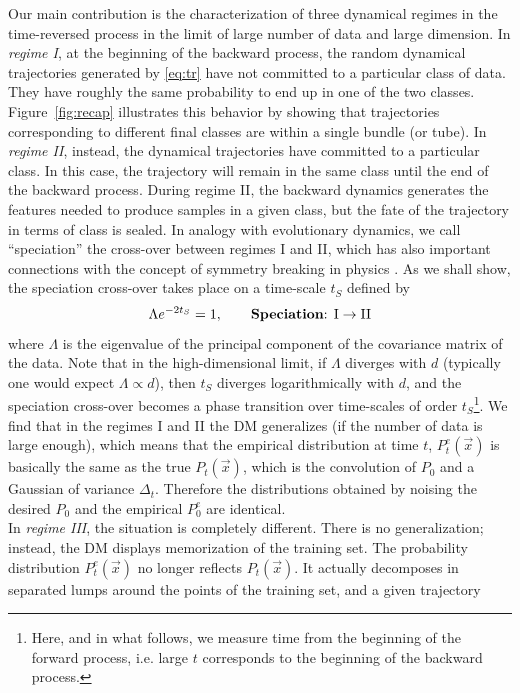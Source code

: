 \documentclass[10pt,twocolumn]{article}
\newcommand{\vx}{\vec x}
\begin{document}
Our main contribution is the characterization of three dynamical regimes in the time-reversed process in the limit of large number of data and large dimension.
In {\it regime I}, at the beginning of the backward process, the random dynamical trajectories generated by \eqref{eq:tr} have not committed to a particular class of data. They have roughly the same probability to end up in one of the two classes. Figure~\ref{fig:recap} illustrates this behavior by showing that trajectories corresponding to different final classes are within a single bundle (or tube). In {\it regime II}, instead, the dynamical trajectories have committed to a particular class. In this case,  the trajectory will remain in the same class until the end of the backward process. 
During regime II, the backward dynamics generates the features needed to produce samples in a given class, but the fate of the trajectory in terms of class is sealed. In analogy with evolutionary dynamics, we call ``speciation'' the cross-over between regimes I and II, which has also important connections with the concept of symmetry breaking in physics \cite{GBM,ambrogioni}. As we shall show, the speciation cross-over takes place on a time-scale $t_S$ defined by
\begin{equation}\label{crit-spec}
    \Lambda e^{-2t_S} = 1,   \qquad \text{{\bf Speciation}: I}\rightarrow \text{II}
\end{equation}
where $\Lambda$ is the eigenvalue of the principal component of the covariance matrix of the data.  
Note that in the high-dimensional limit, if $\Lambda$ diverges with $d$ (typically one would expect $\Lambda \propto d$), then $t_S$ diverges logarithmically with $d$, and the speciation cross-over becomes a phase transition over time-scales of order $t_S$\footnote{Here, and in what follows, we measure time from the beginning of the forward process, i.e. large $t$ corresponds to the beginning of the backward process.}. 
We find that in the regimes I and II the DM generalizes (if the number of data is large enough), which means that the empirical distribution at time $t$, $P_t^e(\vx)$ is basically the same as the true $P_t(\vx)$, which is the convolution of $P_0$ and a Gaussian of variance $\Delta_t$. Therefore the distributions obtained by noising  the desired $P_0$ and the empirical $P_0^e$ are identical. \\
In {\it regime III}, the situation is completely different. There is no generalization; instead, the DM displays memorization of the training set. The probability distribution 
$P_t^e(\vx)$ no longer reflects $P_t(\vx)$. It actually decomposes in separated lumps around the points of the training set, and a given trajectory
\end{document}
